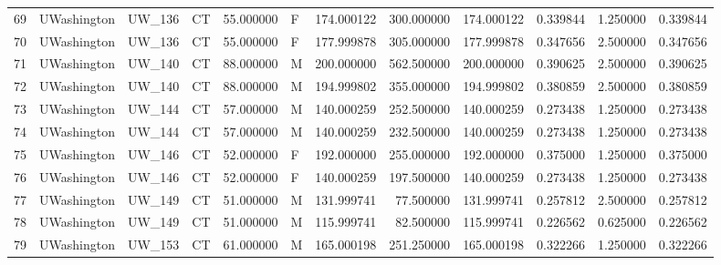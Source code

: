 \begin{tabular}{llllrlrrrrrr}
69     &     UWashington &       UW\_136 &                 CT &  55.000000 &        F &       174.000122 &    300.000000 &  174.000122 &               0.339844 &            1.250000 &          0.339844 \\
70     &     UWashington &       UW\_136 &                 CT &  55.000000 &        F &       177.999878 &    305.000000 &  177.999878 &               0.347656 &            2.500000 &          0.347656 \\
71     &     UWashington &       UW\_140 &                 CT &  88.000000 &        M &       200.000000 &    562.500000 &  200.000000 &               0.390625 &            2.500000 &          0.390625 \\
72     &     UWashington &       UW\_140 &                 CT &  88.000000 &        M &       194.999802 &    355.000000 &  194.999802 &               0.380859 &            2.500000 &          0.380859 \\
73     &     UWashington &       UW\_144 &                 CT &  57.000000 &        M &       140.000259 &    252.500000 &  140.000259 &               0.273438 &            1.250000 &          0.273438 \\
74     &     UWashington &       UW\_144 &                 CT &  57.000000 &        M &       140.000259 &    232.500000 &  140.000259 &               0.273438 &            1.250000 &          0.273438 \\
75     &     UWashington &       UW\_146 &                 CT &  52.000000 &        F &       192.000000 &    255.000000 &  192.000000 &               0.375000 &            1.250000 &          0.375000 \\
76     &     UWashington &       UW\_146 &                 CT &  52.000000 &        F &       140.000259 &    197.500000 &  140.000259 &               0.273438 &            1.250000 &          0.273438 \\
77     &     UWashington &       UW\_149 &                 CT &  51.000000 &        M &       131.999741 &     77.500000 &  131.999741 &               0.257812 &            2.500000 &          0.257812 \\
78     &     UWashington &       UW\_149 &                 CT &  51.000000 &        M &       115.999741 &     82.500000 &  115.999741 &               0.226562 &            0.625000 &          0.226562 \\
79     &     UWashington &       UW\_153 &                 CT &  61.000000 &        M &       165.000198 &    251.250000 &  165.000198 &               0.322266 &            1.250000 &          0.322266 \\

\end{tabular}
